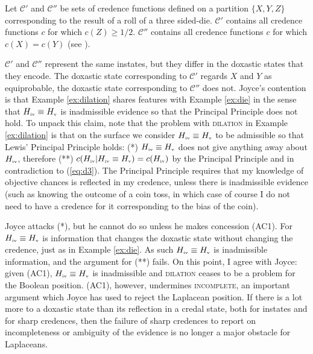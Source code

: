 \documentclass[11pt]{article}
\begin{document}
\begin{quotex}
  \label{ex:die} Let $\mathcal{C}'$ and
  $\mathcal{C}''$ be sets of credence functions defined on a partition
  $\{X,Y,Z\}$ corresponding to the result of a roll of a three
  sided-die. $\mathcal{C}'$ contains all credence functions $c$ for
  which $c(Z)\geq{}1/2$. $\mathcal{C}''$ contains all credence
  functions $c$ for which $c(X)=c(Y)$ (see ).
\end{quotex}

$\mathcal{C}'$ and $\mathcal{C}''$ represent the same instates, but
they differ in the doxastic states that they encode. The doxastic
state corresponding to $\mathcal{C}'$ regards $X$ and $Y$ as
equiprobable, the doxastic state corresponding to $\mathcal{C}''$ does
not. Joyce's contention is that Example \ref{ex:dilation} shares
features with Example \ref{ex:die} in the sense that
$H_{\mbox{\tiny{iv}}}\equiv{}H_{\mbox{\tiny{v}}}$ is inadmissible
evidence so that the Principal Principle does not hold. To unpack this
claim, note that the problem with \textsc{dilation} in Example
\ref{ex:dilation} is that on the surface we consider
$H_{\mbox{\tiny{iv}}}\equiv{}H_{\mbox{\tiny{v}}}$ to be admissible so
that Lewis' Principal Principle holds: (*)
$H_{\mbox{\tiny{iv}}}\equiv{}H_{\mbox{\tiny{v}}}$ does not give
anything away about $H_{\mbox{\tiny{iv}}}$, therefore (**)
$c(H_{\mbox{\tiny{iv}}}|H_{\mbox{\tiny{iv}}}\equiv{}H_{\mbox{\tiny{v}}})=c(H_{\mbox{\tiny{iv}}})$
by the Principal Principle and in contradiction to (\ref{eq:d3}). The
Principal Principle requires that my knowledge of objective chances is
reflected in my credence, unless there is inadmissible evidence (such
as knowing the outcome of a coin toss, in which case of course I do
not need to have a credence for it corresponding to the bias of the
coin).

Joyce attacks (*), but he cannot do so unless he makes concession
(AC1). For $H_{\mbox{\tiny{iv}}}\equiv{}H_{\mbox{\tiny{v}}}$ is
information that changes the doxastic state without changing the
credence, just as in Example \ref{ex:die}. As such
$H_{\mbox{\tiny{iv}}}\equiv{}H_{\mbox{\tiny{v}}}$ is inadmissible
information, and the argument for (**) fails. On this point,
I agree with Joyce: given (AC1),
$H_{\mbox{\tiny{iv}}}\equiv{}H_{\mbox{\tiny{v}}}$ is inadmissible and
\textsc{dilation} ceases to be a problem for the Boolean position.
(AC1), however, undermines \textsc{incomplete}, an important argument
which Joyce has used to reject the Laplacean position. If there is a
lot more to a doxastic state than its reflection in a credal state,
both for instates and for sharp credences, then the failure of sharp
credences to report on incompleteness or ambiguity of the evidence is
no longer a major obstacle for Laplaceans.
\end{document}
